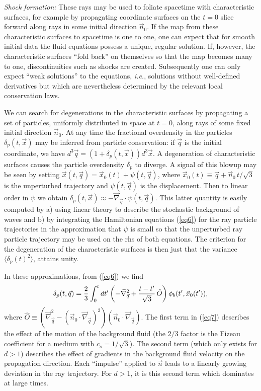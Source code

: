 \documentclass[prl,aps,10pt,twocolumn,showkeys,nofootinbib]{revtex4-1}
\def\ben{\begin{equation}}
\def\een{\end{equation}}
\begin{document}
{\it Shock formation:} These rays may be used to foliate spacetime with characteristic surfaces, for example by propagating coordinate surfaces on the $t=0$ slice forward along rays in some initial direction $\vec{n}_0$. If the map from these characteristic surfaces to spacetime is one to one, one can expect that for smooth initial data the fluid equations possess a unique, regular solution. If, however, the characteristic surfaces ``fold back'' on themselves so that the map becomes many to one, discontinuities such as shocks are created. Subsequently one can only expect ``weak solutions'' to the equations, {\it i.e.}, solutions without well-defined derivatives but which are nevertheless determined by the relevant local conservation laws.  

We can search for degenerations in the characteristic surfaces by propagating a set of particles, uniformly distributed in space at $t=0$, along rays of some fixed initial direction $\vec{n}_0$. At any time the fractional overdensity in the particles $\delta_{p}(t,\vec{x})$ may be inferred from particle conservation: if $\vec{q}$ is the initial coordinate, we have $d^3\vec{q}=\left(1+\delta_{p}(t,\vec{x}) \right)d^3 \vec{x}$. A degeneration of characteristic surfaces causes the particle overdensity $\delta_{p}$ to diverge. A signal of this blowup may be seen by
setting $\vec{x}(t,\vec{q})=\vec{x}_0(t)+\psi(t, \vec{q})$, where $\vec{x}_0(t)\equiv \vec{q}+\vec{n}_0\,t/\sqrt{3}$ is the unperturbed trajectory and $\psi(t,\vec{q})$ is the displacement. Then to linear order in $\psi$ we obtain $\delta_{p}(t,\vec{x}) \approx -\vec{\nabla}_{\vec{q}} \cdot \psi(t,\vec{q})$. This latter quantity is easily computed by a) using linear theory to describe the stochastic background of waves and b) by integrating the Hamiltonian equations (\ref{eq6}) for the ray particle trajectories in the approximation that $\psi$ is small so that the unperturbed ray particle trajectory may be used on the rhs of both equations. The criterion for the degeneration of the characteristic surfaces is then just that the variance $\langle\delta_{p}(t)^2\rangle$, attains unity. 

In these approximations, from (\ref{eq6}) we find
\ben
\delta_{p}(t,\vec{q}) ={2\over 3} \int_0^t dt' \left(-\vec{\nabla}_{\vec{q}}^2 +{t-t' \over \sqrt{3}} \,\hat{ O} \right) \phi_{b}(t',\vec{x}_0(t')),
\label{eq7}
\een
where $\hat{ O}\equiv \left(\vec{\nabla}_{\vec{q}}^2-(\vec{n}_0\cdot\vec{\nabla}_{\vec{q}})^2\right)(\vec{n}_0\cdot \vec{\nabla}_{\vec{q}})$. The first term in (\ref{eq7}) describes the effect of the motion of the background fluid (the $2/3$ factor is the Fizeau coefficient for a medium with $c_s=1/\sqrt{3}$). The second term (which only exists for $d>1$) describes the effect of gradients in the background fluid velocity on the propagation direction. Each ``impulse'' applied to $\vec{n}$ leads to a linearly growing deviation in the ray trajectory. For $d>1$, it is this second term which dominates at large times. 
\end{document}
